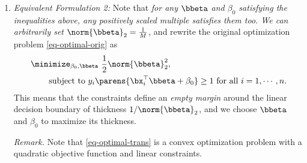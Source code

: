 \documentclass[12pt]{article}
\begin{document}
\begin{enumerate}[label=\textbf{\arabic*.}]
\begin{enumerate}
		\item \textit{Equivalent Formulation 2:} Note that \textit{for any $\bbeta$ and $\beta_0$ satisfying the inequalities above, any positively scaled multiple satisfies them too. We can arbitrarily set $\norm{\bbeta}_2 = \frac{1}{M}$}, and rewrite the original optimization problem \eqref{eq-optimal-orig} as 
		\begin{equation}\label{eq-optimal-trans}
			\begin{aligned}
				& \, \minimize_{\beta_0, \bbeta} \ \frac{1}{2} \norm{\bbeta}_2^2, \\ 
				& \qquad \text{ subject to } y_i \parens{\bx_i^\top \bbeta + \beta_0} \ge 1 \text{ for all } i = 1, \cdots, n. 
			\end{aligned}
		\end{equation}
		This means that the constraints define an \emph{empty margin} around the linear decision boundary of thickness $1/\norm{\bbeta}_2$, and we choose $\bbeta$ and $\beta_0$ to maximize its thickness. 
		
		\textit{Remark.} Note that \eqref{eq-optimal-trans} is a convex optimization problem with a quadratic objective function and linear constraints. 
		

\end{enumerate}
\end{enumerate}
\end{document}
